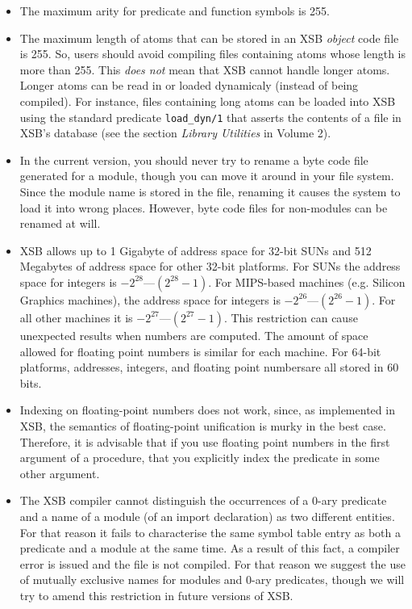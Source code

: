 \begin{itemize}
\item	The maximum arity for predicate and function symbols is 255.
%
\item	The maximum length of atoms that can be stored in an XSB
  \emph{object} code file is 255.  So, users should avoid compiling files
  containing atoms whose length is more than 255. This \emph{does not} mean
  that XSB cannot handle longer atoms. Longer atoms can be read in or
  loaded dynamicaly (instead of being compiled).  For instance, files
  containing long atoms can be loaded into XSB using the standard
  predicate {\tt load\_dyn/1} that asserts the contents of a file in XSB's
  database (see the section {\em Library Utilities} in Volume 2).
%
\item	In the current version, you should never try to rename a byte code 
      file generated for a module, though you can move it around in your 
      file system.  Since the module name is stored in the file, renaming it
      causes the system to load it into wrong places.  However, byte code 
      files for non-modules can be renamed at will.
%
\item XSB allows up to 1 Gigabyte of address space for 32-bit SUNs and 512
      Megabytes of address space for other 32-bit platforms.  For SUNs the
      address space for integers is $-2^{28}$---$(2^{28}-1)$.  For
      MIPS-based machines (e.g. Silicon Graphics machines), the
      address space for integers is $-2^{26}$---$(2^{26}-1)$.  For all
      other machines it is $-2^{27}$---$(2^{27}-1)$.  This restriction can
      cause unexpected results when numbers are computed.  The amount
      of space allowed for floating point numbers is similar for each
      machine.  For 64-bit platforms, addresses, integers, and
	floating point numbersare all stored in 60 bits.
%
\item	Indexing on floating-point numbers does not work, since, as
implemented in XSB, the semantics
      of floating-point unification is murky in the best case. Therefore, it
      is advisable that if you use floating point numbers in the first 
      argument of a procedure,  that you explicitly index the
      predicate in some other argument.
%
\item	The XSB compiler cannot distinguish the occurrences of a
      0-ary predicate and a name of a module (of an import declaration) as
      two different entities.  For that reason it fails to characterise the
      same symbol table entry as both a predicate and a module at the
      same time.  As a result of this fact, a compiler error is issued
      and the file is not compiled.  For that reason we suggest the
      use of mutually exclusive names for modules and 0-ary predicates,
      though we will try to amend this restriction in future versions of
      XSB.
\end{itemize}


